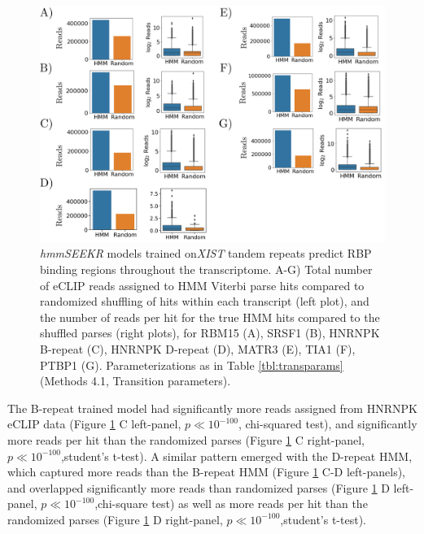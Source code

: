 \begin{figure}[h!]
\centering
\includegraphics[width=.95\textwidth]{images/transcriptomescan.pdf}
\caption[Transcriptome-wide prediction of RBP binding regions]{\emph{hmmSEEKR} models trained on\emph{XIST} tandem repeats predict RBP binding regions throughout the transcriptome. A-G) Total number of eCLIP reads assigned to HMM Viterbi parse hits compared to randomized shuffling of hits within each transcript (left plot), and the number of reads per hit for the true HMM hits compared to the shuffled parses (right plots), for RBM15 (A), SRSF1 (B), HNRNPK B-repeat (C), HNRNPK D-repeat (D), MATR3 (E), TIA1 (F), PTBP1 (G). Parameterizations as in Table \ref{tbl:transparams} (Methods 4.1, Transition parameters).}
\label{fig:transcriptome}
\end{figure}

The B-repeat trained model had significantly more reads assigned from HNRNPK eCLIP data (Figure \ref{fig:transcriptome} C left-panel, $p\ll10^{-100}$, chi-squared test), and significantly more reads per hit than the randomized parses (Figure \ref{fig:transcriptome} C right-panel, $p\ll10^{-100}$,student's t-test). A similar pattern emerged with the D-repeat HMM, which captured more reads than the B-repeat HMM (Figure \ref{fig:transcriptome} C-D left-panels), and overlapped significantly more reads than randomized parses (Figure \ref{fig:transcriptome} D left-panel, $p\ll10^{-100}$,chi-square test) as well as more reads per hit than the randomized parses (Figure \ref{fig:transcriptome} D right-panel, $p\ll10^{-100}$,student's t-test). 

